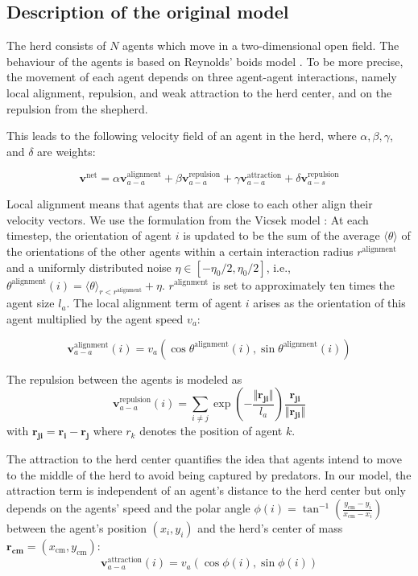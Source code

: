 \subsection{Description of the original model}

The herd consists of $N$ agents which move in a two-dimensional open field. The behaviour of the agents is based on Reynolds' boids model \cite{boids}. To be more precise, the movement of each agent depends on three agent-agent interactions, namely local alignment, repulsion, and weak attraction to the herd center, and on the repulsion from the shepherd.

This leads to the following velocity field of an agent in the herd, where $\alpha, \beta, \gamma$, and $\delta$ are weights:

\begin{equation}
\label{eq:agent_velocity}
\boldsymbol{v}^{\text{net}} = \alpha \boldsymbol{v}^{\text{alignment}}_{a-a} + \beta \boldsymbol{v}^{\text{repulsion}}_{a-a} + \gamma \boldsymbol{v}^{\text{attraction}}_{a-a} + \delta \boldsymbol{v}^{\text{repulsion}}_{a-s} 
\end{equation}

Local alignment means that agents that are close to each other align their velocity vectors. We use the formulation from the Vicsek model \cite{alignment}: At each timestep, the orientation of agent $i$ is updated to be the sum of the average $\langle \theta \rangle$ of the orientations of the other agents within a certain interaction radius $r^\text{alignment}$ and a uniformly distributed noise $\eta \in [-\eta_0 / 2, \eta_0 / 2]$, i.e., $\theta^\text{alignment}(i) = \langle \theta \rangle_{r < r^\text{alignment}} + \eta$. $r^\text{alignment}$ is set to approximately ten times the agent size $l_a$. The local alignment term of agent $i$ arises as the orientation of this agent multiplied by the agent speed $v_a$:

$$\boldsymbol{v}^{\text{alignment}}_{a-a}(i) = v_a 
 \left(\cos \theta^\text{alignment}(i), \sin\theta^\text{alignment}(i)\right)$$

The repulsion between the agents is modeled as
$$\boldsymbol{v}^{\text{repulsion}}_{a-a}(i) = \sum_{i \neq j} \exp\left( -\frac{\Vert\boldsymbol{r_{ji}}\Vert}{l_a}\right)\frac{\boldsymbol{r_{ji}}}{\Vert\boldsymbol{r_{ji}}\Vert}$$
with $\boldsymbol{r_{ji}} = \boldsymbol{r_i} - \boldsymbol{r_j}$ where $r_k$ denotes the position of agent $k$.

The attraction to the herd center quantifies the idea that agents intend to move to the middle of the herd to avoid being captured by predators. In our model, the attraction term is independent of an agent's distance to the herd center but only depends on the agents' speed and the polar angle $\phi(i) = \tan^{-1}\left(\frac{y_\text{cm} - y_i}{x_\text{cm} - x_i}\right)$ between the agent's position $(x_i, y_i)$ and the herd's center of mass $\boldsymbol{r_\text{cm}} = (x_\text{cm}, y_\text{cm})$:
$$\boldsymbol{v}^\text{attraction}_{a-a}(i) = v_a \left(\cos \phi(i), \sin \phi(i)\right)$$

